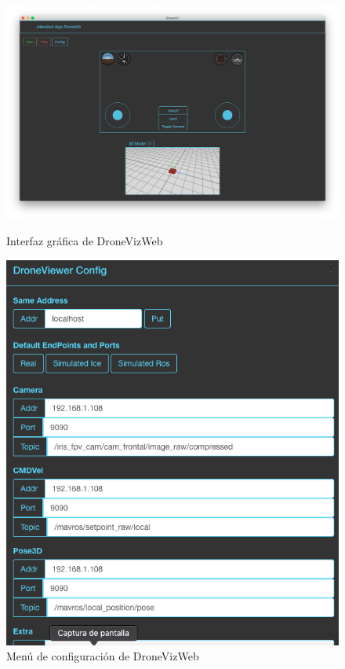 \begin{figure}[htb]
\centering
  \begin{minipage}{0.45\textwidth}
    \centering
    \includegraphics[width=1\textwidth]{figures/interfazdroneviz.png}
    \caption{Interfaz gráfica de DroneVizWeb}
    \label{fig.iterfazdroneviz}
  \end{minipage}%
  \hspace{5mm}
  \begin{minipage}{0.45\textwidth}
    \centering
    \includegraphics[width=1\textwidth]{figures/configdroneviz.png}
    \caption{Menú de configuración de DroneVizWeb}
    \label{fig.configdroneviz}
  \end{minipage}
\end{figure}

